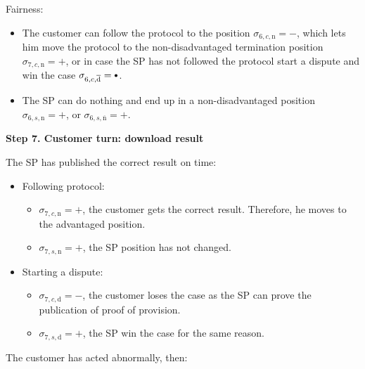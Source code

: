 \documentclass{ieeeaccess}
\newcommand\sbullet[1][.75]{\mathbin{\ThisStyle{\vcenter{\hbox{%
  \scalebox{#1}{$\SavedStyle\bullet$}}}}}%
}
\begin{document}
Fairness:

\begin{itemize}

\item
  The customer can follow the protocol to the position \(\sigma_{6, c, \mathrm{n}} = -\), which lets him move the protocol to the non-disadvantaged termination position \(\sigma_{7, c, \mathrm{n}} = +\), or in case the SP has not followed the protocol start a dispute and win the case \(\sigma_{6, c, \overline{\mathrm{d}}} = \sbullet\).
\item
  The SP can do nothing and end up in a non-disadvantaged position \(\sigma_{6, s, \mathrm{n}} = +\), or \(\sigma_{6, s, \overline{\mathrm{n}}} = +\).
\end{itemize}

\noindent \textbf
{Step 7. Customer turn: download result}\label{step-7-retrieval-of-results}

The SP has published the correct result on time:

\begin{itemize}
\item
  Following protocol:

  \begin{itemize}
  
  \item
    \(\sigma_{7, c, \mathrm{n}} = +\), the customer gets the correct result. Therefore, he moves to the advantaged position. 
  \item
    \(\sigma_{7, s, \mathrm{n}} = +\), the SP position has not changed. 
  \end{itemize}
\item
  Starting a dispute:

  \begin{itemize}
  
  \item
    \(\sigma_{7, c, \mathrm{d}} = -\), the customer loses the case as the SP can prove the publication of proof of provision. 
  \item
    \(\sigma_{7, s, \mathrm{d}} = +\), the SP win the case for the same reason.
  \end{itemize}
\end{itemize}

The customer has acted abnormally, then:
\end{document}
